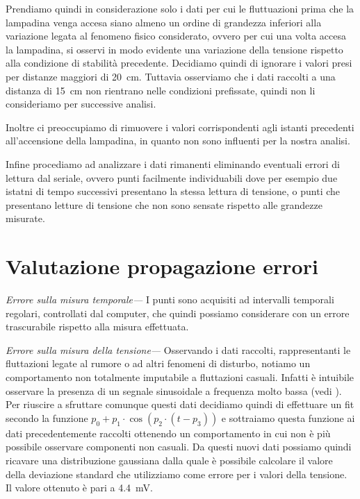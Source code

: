 \documentclass[
    rmp,
    reprint, 
    superscriptaddress, 
    altaffilletter, 
    amsmath, 
    amssymb,
    a4paper]{revtex4-2}
\begin{document}
Prendiamo quindi in considerazione solo i dati per cui le fluttuazioni prima che la lampadina venga accesa siano almeno un ordine di grandezza inferiori alla variazione legata al fenomeno fisico considerato, ovvero per cui una volta accesa la lampadina, si osservi in modo evidente una variazione della tensione rispetto alla condizione di stabilità precedente. Decidiamo quindi di ignorare i valori presi per distanze maggiori di \SI{20}{\centi\metre}. Tuttavia  osserviamo che i dati raccolti a una distanza di \SI{15}{\centi\metre} non rientrano nelle condizioni prefissate, quindi non li consideriamo per successive analisi. 

Inoltre ci preoccupiamo di rimuovere i valori corrispondenti agli istanti precedenti all'accensione della lampadina, in quanto non sono influenti per la nostra analisi.

Infine procediamo ad analizzare i dati rimanenti eliminando eventuali errori di lettura dal seriale, ovvero punti facilmente individuabili dove per esempio due istatni di tempo successivi presentano la stessa lettura di tensione, o punti che presentano letture di tensione che non sono sensate rispetto alle grandezze misurate. 

\section*{Valutazione propagazione errori}

\noindent\textit{Errore sulla misura temporale---}
I punti sono acquisiti ad intervalli temporali regolari, controllati dal computer, che quindi possiamo considerare con un errore trascurabile rispetto alla misura effettuata. 

\noindent\textit{Errore sulla misura della tensione---}
Osservando i dati raccolti, rappresentanti le fluttazioni legate al rumore o ad altri fenomeni di disturbo, notiamo un comportamento non totalmente imputabile a fluttazioni casuali. Infatti è intuibile osservare la presenza di un segnale sinusoidale a frequenza molto bassa (vedi ). Per riuscire a sfruttare comunque questi dati decidiamo quindi di effettuare un fit secondo la funzione $p_0+p_1\cdot \cos(p_2\cdot (t-p_3))$ e sottraiamo questa funzione ai dati precedentemente raccolti ottenendo un comportamento in cui non è più possibile osservare componenti non casuali. Da questi nuovi dati possiamo quindi ricavare una distribuzione gaussiana dalla quale è possibile calcolare il valore della deviazione standard che utilizziamo come errore per i valori della tensione. Il valore ottenuto è pari a \SI{4.4}{\milli\volt}.
\end{document}
